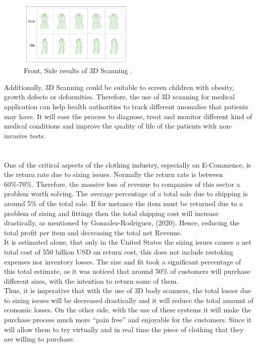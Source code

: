 \documentclass[a4paper]{thesis}
\begin{document}
\begin{figure}[h]
    \begin{center}
    \includegraphics[width=0.5\textwidth]{bodyMedicine.png}
    \caption{Front, Side results of 3D Scanning \cite[]{treleaven_wells_2007}.}
    \label{bodymed}
\end{center}
\end{figure}
Additionally, 3D Scanning could be suitable to screen children with obesity, growth defects or deformities.
Therefore, the use of 3D scanning for medical application can help health authorities to track different anomalies that patients may have.
It will ease the process to diagnose, treat and monitor different kind of medical conditions and improve the quality of life of the patients with non-invasive tests. \\[12pt] 
\enlargethispage{\baselineskip}


\section*{}
One of the critical aspects of the clothing industry, especially on E-Commence, is the return rate due to sizing issues. Normally the return rate is between 60\%-70\%.
Therefore, the massive loss of revenue to companies of this sector a problem worth solving. 
The average percentage of a total sale due to shipping is around 5\% of the total sale. 
If for instance the item must be returned due to a problem of sizing and fittings then the total shipping cost will increase drastically, as mentioned by Gonzalez-Rodriguez, (2020). 
Hence, reducing the total profit per item and decreasing the total net Revenue.\\[10pt]
It is estimated alone, that only in the United States the sizing issues causes a net total cost of 550 billion USD on return cost, this does not include restoking expenses nor inventory losses.
The size and fit took a significant percentage of this total estimate, as it was noticed that around 50\% of customers will purchase different sizes, with the intention to return some of them.\\[10pt]
Thus, it is imperative that with the use of 3D body scanners, the total losses due to sizing issues will be decreased drastically and it will reduce the total amount of economic losses.
On the other side, with the use of these systems it will make the purchase process much more “pain free” and enjoyable for the customers. Since it will allow them to try virtually and in real time the piece of clothing that they are willing to purchase.
\end{document}
